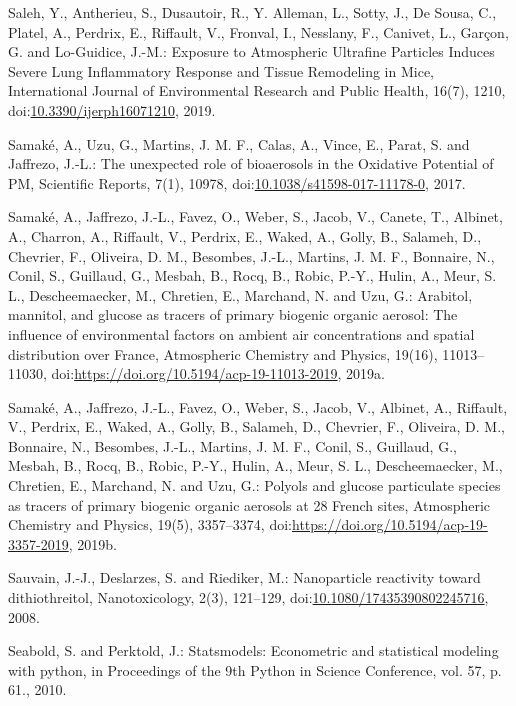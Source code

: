 \documentclass[
]{article}
\begin{document}
Saleh, Y., Antherieu, S., Dusautoir, R., Y. Alleman, L., Sotty, J., De
Sousa, C., Platel, A., Perdrix, E., Riffault, V., Fronval, I., Nesslany,
F., Canivet, L., Garçon, G. and Lo-Guidice, J.-M.: Exposure to
Atmospheric Ultrafine Particles Induces Severe Lung Inflammatory
Response and Tissue Remodeling in Mice, International Journal of
Environmental Research and Public Health, 16(7), 1210,
doi:\href{https://doi.org/10.3390/ijerph16071210}{10.3390/ijerph16071210},
2019.

Samaké, A., Uzu, G., Martins, J. M. F., Calas, A., Vince, E., Parat, S.
and Jaffrezo, J.-L.: The unexpected role of bioaerosols in the Oxidative
Potential of PM, Scientific Reports, 7(1), 10978,
doi:\href{https://doi.org/10.1038/s41598-017-11178-0}{10.1038/s41598-017-11178-0},
2017.

Samaké, A., Jaffrezo, J.-L., Favez, O., Weber, S., Jacob, V., Canete,
T., Albinet, A., Charron, A., Riffault, V., Perdrix, E., Waked, A.,
Golly, B., Salameh, D., Chevrier, F., Oliveira, D. M., Besombes, J.-L.,
Martins, J. M. F., Bonnaire, N., Conil, S., Guillaud, G., Mesbah, B.,
Rocq, B., Robic, P.-Y., Hulin, A., Meur, S. L., Descheemaecker, M.,
Chretien, E., Marchand, N. and Uzu, G.: Arabitol, mannitol, and glucose
as tracers of primary biogenic organic aerosol: The influence of
environmental factors on ambient air concentrations and spatial
distribution over France, Atmospheric Chemistry and Physics, 19(16),
11013--11030,
doi:\href{https://doi.org/https://doi.org/10.5194/acp-19-11013-2019}{https://doi.org/10.5194/acp-19-11013-2019},
2019a.

Samaké, A., Jaffrezo, J.-L., Favez, O., Weber, S., Jacob, V., Albinet,
A., Riffault, V., Perdrix, E., Waked, A., Golly, B., Salameh, D.,
Chevrier, F., Oliveira, D. M., Bonnaire, N., Besombes, J.-L., Martins,
J. M. F., Conil, S., Guillaud, G., Mesbah, B., Rocq, B., Robic, P.-Y.,
Hulin, A., Meur, S. L., Descheemaecker, M., Chretien, E., Marchand, N.
and Uzu, G.: Polyols and glucose particulate species as tracers of
primary biogenic organic aerosols at 28 French sites, Atmospheric
Chemistry and Physics, 19(5), 3357--3374,
doi:\href{https://doi.org/https://doi.org/10.5194/acp-19-3357-2019}{https://doi.org/10.5194/acp-19-3357-2019},
2019b.

Sauvain, J.-J., Deslarzes, S. and Riediker, M.: Nanoparticle reactivity
toward dithiothreitol, Nanotoxicology, 2(3), 121--129,
doi:\href{https://doi.org/10.1080/17435390802245716}{10.1080/17435390802245716},
2008.

Seabold, S. and Perktold, J.: Statsmodels: Econometric and statistical
modeling with python, in Proceedings of the 9th Python in Science
Conference, vol. 57, p. 61., 2010.
\end{document}
